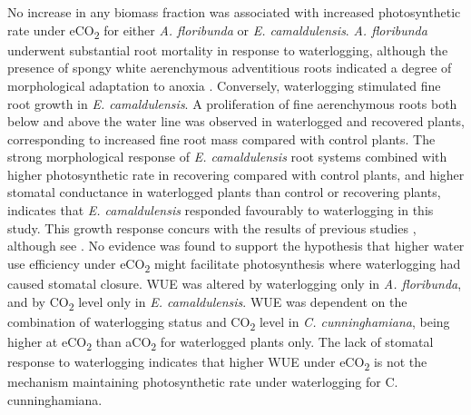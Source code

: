 \documentclass[12pt,a4paper]{memoir}
\begin{document}
No increase in any biomass fraction was associated with increased photosynthetic rate under eCO\textsubscript{2} for either \textit{A. floribunda} or \textit{E. camaldulensis}. \textit{A. floribunda} underwent substantial root mortality in response to waterlogging, although the presence of spongy white aerenchymous adventitious roots indicated a degree of morphological adaptation to anoxia \citep{Evans2004}. Conversely, waterlogging stimulated fine root growth in \textit{E. camaldulensis}. A proliferation of fine aerenchymous roots both below and above the water line was observed in waterlogged and recovered plants, corresponding to increased fine root mass compared with control plants. The strong morphological response of \textit{E. camaldulensis} root systems combined with higher photosynthetic rate in recovering compared with control plants, and higher stomatal conductance in waterlogged plants than control or recovering plants, indicates that \textit{E. camaldulensis} responded favourably to waterlogging in this study. This growth response concurs with the results of previous studies \citep{Sena-Gomes1980, Marcar1993}, although see \citep{Kogawara2006}. No evidence was found to support the hypothesis that higher water use efficiency under eCO\textsubscript{2} might facilitate photosynthesis where waterlogging had caused stomatal closure. WUE was altered by waterlogging only in \textit{A. floribunda}, and by CO\textsubscript{2} level only in \textit{E. camaldulensis}. WUE was dependent on the combination of waterlogging status and CO\textsubscript{2} level in \textit{C. cunninghamiana}, being higher at eCO\textsubscript{2} than aCO\textsubscript{2} for waterlogged plants only. The lack of stomatal response to waterlogging indicates that higher WUE under eCO\textsubscript{2} is not the mechanism maintaining photosynthetic rate under waterlogging for C. cunninghamiana. 
\end{document}
